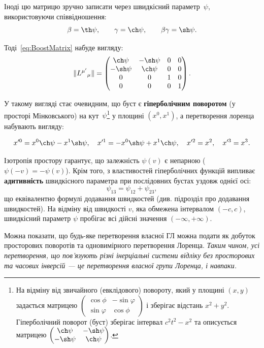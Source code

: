 \documentclass[%
biblatex,
]{ConspectBook}
\begin{document}
{\color{blue!80} Іноді цю матрицю зручно записати через швидкісний параметр~$\psi$, використовуючи співвідношення:
\[
\beta = \th\psi, \qquad \gamma = \ch\psi, \qquad \beta\gamma = \sh\psi.
\]


Тоді~\eqref{eq:BoostMatrix} набуде вигляду:
\begin{equation}
\|L^{\mu'}{}_{\mu}\| =
\begin{pmatrix}
\ch\psi & -\sh\psi & 0 & 0 \\
-\sh\psi &  \ch\psi & 0 & 0 \\
0 & 0 & 1 & 0 \\
0 & 0 & 0 & 1
\end{pmatrix}.
\label{eq:boost_hyperbolic}
\end{equation}


У такому вигляді стає очевидним, що буст є \textbf{гіперболічним поворотом} (у просторі Мінковського) на кут~$\psi$\footnote{%
На відміну від звичайного (евклідового) повороту, який у площині $(x, y)$ задається матрицею
$\begin{pmatrix} \cos\phi & -\sin\varphi \\ \sin\varphi & \cos\phi \end{pmatrix}$ і зберігає відстань
$x^2 + y^2$. Гіперболічний поворот (буст) зберігає інтервал $c^2 t^2 - x^2$ та описується матрицею
$\begin{pmatrix} \ch\psi & -\sh\psi \\ -\sh\psi & \ch\psi \end{pmatrix}$.}
у площині $(x^0, x^1)$, а перетворення лоренца набувають вигляду:

\[
x^{\prime 0} = x^0 \ch\psi - x^1 \sh\psi,\quad
x^{\prime 1} = -x^0 \sh\psi + x^1 \ch\psi,\quad
x^{\prime 2} = x^2,\quad
x^{\prime 3} = x^3.
\]


Ізотропія простору гарантує, що залежність $\psi(v)$ є непарною
($\psi(-v) = -\psi(v)$). Крім того, з властивостей гіперболічних функцій
випливає \textbf{адитивність} швидкісного параметра при послідовних бустах
уздовж однієї осі:
\[
\psi_{13} = \psi_{12} + \psi_{23},
\]
що еквівалентно формулі додавання швидкостей (див. підрозділ про додавання
швидкостей). На відміну від швидкості $v$, яка обмежена інтервалом $(-c,c)$,
швидкісний параметр $\psi$ пробігає всі дійсні значення $(-\infty,+\infty)$.}

Можна показати, що будь-яке перетворення власної ГЛ можна подати як
добуток просторових поворотів та одновимірного перетворення Лоренца.
\textit{Таким чином, усі перетворення, що пов'язують різні інерціальні
системи відліку без просторових та часових інверсій --- це перетворення
власної групи Лоренца, і навпаки.}
\end{document}
